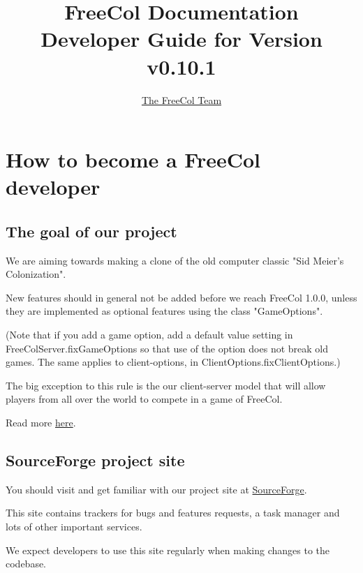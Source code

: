 \documentclass[12pt]{book}
\begin{document}
\author{\href{http://freecol.sourceforge.net/index.php?section=8}{The FreeCol Team}}
\title{FreeCol Documentation\\Developer Guide for Version v0.10.1}
\maketitle{}

\tableofcontents
\newpage


\hypertarget{How to become a FreeCol developer}
            {\chapter{How to become a FreeCol developer}}



\hypertarget{The goal of our project}{\section{The goal of our project}}

We are aiming towards making a clone of the old computer
classic "Sid Meier's Colonization".

New features should in general not be added before we reach
FreeCol 1.0.0, unless they are implemented as optional features
using the class "GameOptions".

(Note that if you add a game option, add a default value setting in
FreeColServer.fixGameOptions so that use of the option does not break
old games.  The same applies to client-options,
in ClientOptions.fixClientOptions.)

The big exception to this rule is the our client-server model that
will allow players from all over the world to compete in a game
of FreeCol.

Read more \href{http://www.freecol.org/index.php?section=2}{here}.


\hypertarget{SourceForge project site}{\section{SourceForge project site}}

You should visit and get familiar with our project site at
\href{http://sourceforge.net/projects/freecol/}{SourceForge}.

This site contains trackers for bugs and features requests,
a task manager and lots of other important services.

We expect developers to use this site regularly when making
changes to the codebase.
\end{document}
